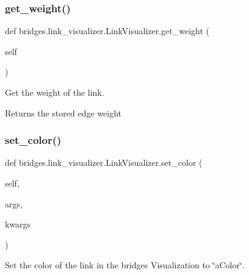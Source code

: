 \subsubsection{\texorpdfstring{get\+\_\+weight()}{get\_weight()}}
{\footnotesize\ttfamily def bridges.\+link\+\_\+visualizer.\+Link\+Visualizer.\+get\+\_\+weight (\begin{DoxyParamCaption}\item[{}]{self }\end{DoxyParamCaption})}



Get the weight of the link. 

\begin{DoxyReturn}{Returns}
the stored edge weight 
\end{DoxyReturn}
\mbox{\label{classbridges_1_1link__visualizer_1_1_link_visualizer_ad94a6377316ff545553b755a957abe92}} 
\subsubsection{\texorpdfstring{set\+\_\+color()}{set\_color()}}
{\footnotesize\ttfamily def bridges.\+link\+\_\+visualizer.\+Link\+Visualizer.\+set\+\_\+color (\begin{DoxyParamCaption}\item[{}]{self,  }\item[{}]{args,  }\item[{}]{kwargs }\end{DoxyParamCaption})}



Set the color of the link in the bridges Visualization to \char`\"{}a\+Color\char`\"{}. 


